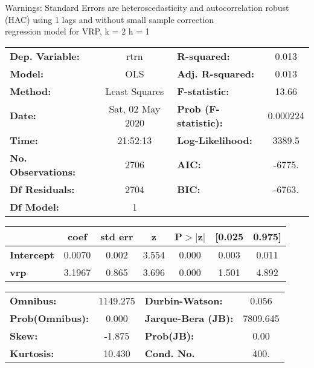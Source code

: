 Warnings: \newline
 [1] Standard Errors are heteroscedasticity and autocorrelation robust (HAC) using 1 lags and without small sample correction\\ 

regression model for VRP, k = 2 h = 1\begin{center}
\begin{tabular}{lclc}
\toprule
\textbf{Dep. Variable:}    &       rtrn       & \textbf{  R-squared:         } &     0.013   \\
\textbf{Model:}            &       OLS        & \textbf{  Adj. R-squared:    } &     0.013   \\
\textbf{Method:}           &  Least Squares   & \textbf{  F-statistic:       } &     13.66   \\
\textbf{Date:}             & Sat, 02 May 2020 & \textbf{  Prob (F-statistic):} &  0.000224   \\
\textbf{Time:}             &     21:52:13     & \textbf{  Log-Likelihood:    } &    3389.5   \\
\textbf{No. Observations:} &        2706      & \textbf{  AIC:               } &    -6775.   \\
\textbf{Df Residuals:}     &        2704      & \textbf{  BIC:               } &    -6763.   \\
\textbf{Df Model:}         &           1      & \textbf{                     } &             \\
\bottomrule
\end{tabular}
\begin{tabular}{lcccccc}
                   & \textbf{coef} & \textbf{std err} & \textbf{z} & \textbf{P$> |$z$|$} & \textbf{[0.025} & \textbf{0.975]}  \\
\midrule
\textbf{Intercept} &       0.0070  &        0.002     &     3.554  &         0.000        &        0.003    &        0.011     \\
\textbf{vrp}       &       3.1967  &        0.865     &     3.696  &         0.000        &        1.501    &        4.892     \\
\bottomrule
\end{tabular}
\begin{tabular}{lclc}
\textbf{Omnibus:}       & 1149.275 & \textbf{  Durbin-Watson:     } &    0.056  \\
\textbf{Prob(Omnibus):} &   0.000  & \textbf{  Jarque-Bera (JB):  } & 7809.645  \\
\textbf{Skew:}          &  -1.875  & \textbf{  Prob(JB):          } &     0.00  \\
\textbf{Kurtosis:}      &  10.430  & \textbf{  Cond. No.          } &     400.  \\
\bottomrule
\end{tabular}
\end{center}

